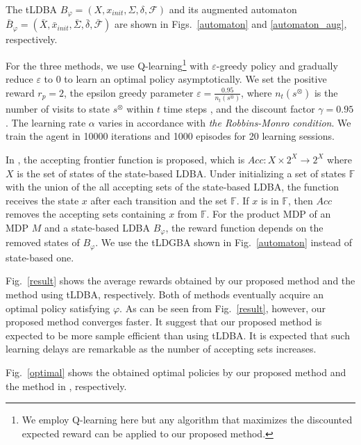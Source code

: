 \documentclass[letterpaper, 10 pt, conference]{ieeeconf}  %
\begin{document}
The tLDBA $B_{\varphi} = (X, x_{init},\Sigma,\delta,\mathcal{F})$ and its augmented automaton $\bar{B}_{\varphi} = (\bar{X},\bar{x}_{init},\bar{\Sigma},\bar{\delta},\bar{\mathcal{F}})$ are shown in Figs.\ \ref{automaton} and \ref{automaton_aug}, respectively.

For the three methods, we use Q-learning\footnote{We employ Q-learning here but any algorithm that maximizes the discounted expected reward can be applied to our proposed method.} with $\varepsilon$-greedy policy and gradually reduce $\varepsilon$ to 0 to learn an optimal policy asymptotically.
We set the positive reward $r_p = 2$, the epsilon greedy parameter $ \varepsilon = \frac{0.95}{n_t(s^{\otimes})}$, where $n_t(s^{\otimes})$ is the number of visits to state $s^{\otimes}$ within $t$ time steps \cite{Singh1998}, and the discount factor $\gamma = 0.95$. The learning rate $\alpha$ varies in accordance with {\it the Robbins-Monro condition}. We train the agent in 10000 iterations and 1000 episodes for 20 learning sessions.

 In \cite{HAK2019,HKAKPL2019}, the accepting frontier function is proposed, which is $Acc : X \times 2^X \rightarrow 2^X $ where $X$ is the set of states of the state-based LDBA. Under initializing a set of states $ \mathbb{F} $ with the union of the all accepting sets of the state-based LDBA, the function receives the state $x$ after each transition and the set $\mathbb{F}$. If $x$ is in $\mathbb{F}$, then $Acc$ removes the accepting sets containing $x$ from $\mathbb{F}$. For the product MDP of an MDP $M$ and a state-based LDBA $B_{\varphi}$, the reward function depends on the removed states of $B_{\varphi}$. We use the tLDGBA shown in Fig.\ \ref{automaton} instead of state-based one.

Fig.\ \ref{result} shows the average rewards obtained by our proposed method and the method using tLDBA, respectively.
Both of methods eventually acquire an optimal policy satisfying $\varphi$. As can be seen from Fig.\ \ref{result}, however, our proposed method converges faster. It suggest that our proposed method is expected to be more sample efficient than using tLDBA. It is expected that such learning delays are remarkable as the number of accepting sets increases.

Fig.\ \ref{optimal} shows the obtained optimal policies by our proposed method and the method in \cite{HAK2019,HKAKPL2019}, respectively.
\end{document}
